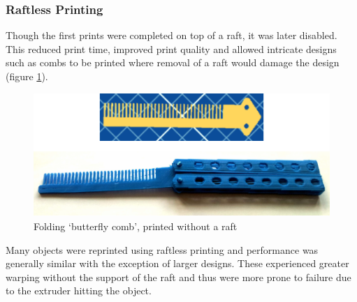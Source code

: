 			\subsubsection{Raftless Printing}
				
				Though the first prints were completed on top of a raft, it was later
				disabled. This reduced print time, improved print quality and allowed
				intricate designs such as combs to be printed where removal of a raft
				would damage the design (figure \ref{fig:comb}).
				
				\begin{figure}
					\includegraphics[width=1\textwidth]{diagrams/comb.pdf}
					\caption{Folding `butterfly comb', printed without a raft}
					\label{fig:comb}
				\end{figure}
				
				Many objects were reprinted using raftless printing and performance was
				generally similar with the exception of larger designs. These
				experienced greater warping without the support of the raft and thus
				were more prone to failure due to the extruder hitting the object.
